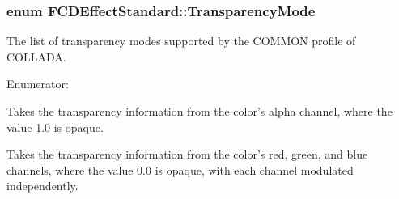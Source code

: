 \hypertarget{classFCDEffectStandard_a9e749ea44e9152c5671985b3e9a7c9a5}{
\subsubsection[{TransparencyMode}]{\setlength{\rightskip}{0pt plus 5cm}enum {\bf FCDEffectStandard::TransparencyMode}}}
\label{classFCDEffectStandard_a9e749ea44e9152c5671985b3e9a7c9a5}
The list of transparency modes supported by the COMMON profile of COLLADA. \begin{Desc}
\item[Enumerator: ]\par
\begin{description}
\item[{\em 
\hypertarget{classFCDEffectStandard_a9e749ea44e9152c5671985b3e9a7c9a5a68c1c4c107542260f18ff3ef04c46762}{
A\_\-ONE}
\label{classFCDEffectStandard_a9e749ea44e9152c5671985b3e9a7c9a5a68c1c4c107542260f18ff3ef04c46762}
}]Takes the transparency information from the color's alpha channel, where the value 1.0 is opaque. \item[{\em 
\hypertarget{classFCDEffectStandard_a9e749ea44e9152c5671985b3e9a7c9a5a0da1b910a6c9fb9553dd131a56295411}{
RGB\_\-ZERO}
\label{classFCDEffectStandard_a9e749ea44e9152c5671985b3e9a7c9a5a0da1b910a6c9fb9553dd131a56295411}
}]Takes the transparency information from the color's red, green, and blue channels, where the value 0.0 is opaque, with each channel modulated independently. \end{description}
\end{Desc}



